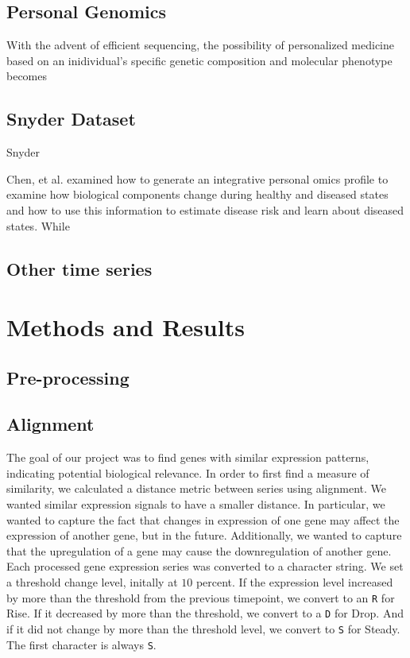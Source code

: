 \documentclass[aps,prd,final,onecolumn,a4paper,10pt]{revtex4}
\begin{document}
\subsection{Personal Genomics}
With the advent of efficient sequencing, the possibility of personalized medicine based on an inidividual's specific genetic composition and molecular phenotype becomes 


\subsection{Snyder Dataset}
Snyder

Chen, et al. examined how to generate an integrative personal omics profile to examine how biological components change during healthy and diseased states and how to use this information to estimate disease risk and learn about diseased states. While 

\subsection{Other time series}


\section{Methods and Results}

\subsection{Pre-processing}



\subsection{Alignment}

The goal of our project was to find genes with similar expression patterns, indicating potential biological relevance.
In order to first find a measure of similarity, we calculated a distance metric between series using alignment.
We wanted similar expression signals to have a smaller distance. In particular, we wanted to capture the fact that changes in expression of one gene may affect the expression of another gene, but in the future. Additionally, we wanted to capture that the upregulation of a gene may cause the downregulation of another gene.
\\

Each processed gene expression series was converted to a character string.
We set a threshold change level, initally at $10$ percent.
If the expression level increased by more than the threshold from the previous timepoint, we convert to an \verb!R! for Rise.
If it decreased by more than the threshold, we convert to a \verb!D! for Drop.
And if it did not change by more than the threshold level, we convert to \verb!S! for Steady. The first character is always \verb!S!.\\
\end{document}
